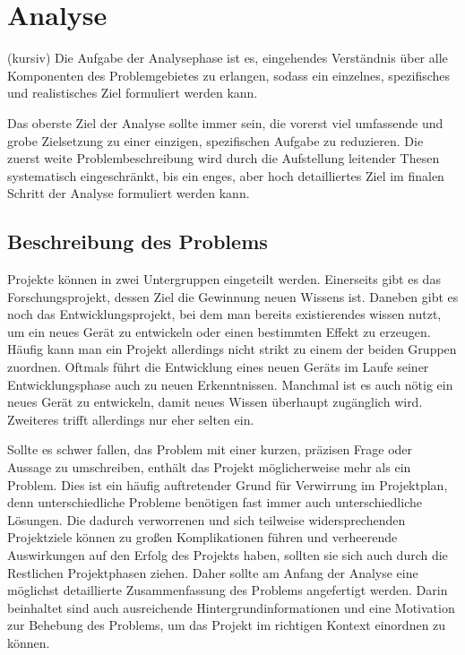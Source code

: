 \section{Analyse}
(kursiv)
Die Aufgabe der Analysephase ist es, eingehendes Verständnis über alle Komponenten des Problemgebietes 
zu erlangen, sodass ein einzelnes, spezifisches und realistisches Ziel formuliert werden kann.

Das oberste Ziel der Analyse sollte immer sein, die vorerst viel umfassende und grobe Zielsetzung zu 
einer einzigen, spezifischen Aufgabe zu reduzieren. Die zuerst weite Problembeschreibung wird durch 
die Aufstellung leitender Thesen systematisch eingeschränkt, bis ein enges, aber hoch detailliertes 
Ziel im finalen Schritt der Analyse formuliert werden kann.

    \subsection{Beschreibung des Problems}

    Projekte können in zwei Untergruppen eingeteilt werden. Einerseits gibt es das Forschungsprojekt, 
    dessen Ziel die Gewinnung neuen Wissens ist. Daneben gibt es noch das Entwicklungsprojekt, bei dem 
    man bereits existierendes wissen nutzt, um ein neues Gerät zu entwickeln oder einen bestimmten 
    Effekt zu erzeugen. Häufig kann man ein Projekt allerdings nicht strikt zu einem der beiden 
    Gruppen zuordnen. Oftmals führt die Entwicklung eines neuen Geräts im Laufe seiner Entwicklungsphase 
    auch zu neuen Erkenntnissen. Manchmal ist es auch nötig ein neues Gerät zu entwickeln, damit neues 
    Wissen überhaupt zugänglich wird. Zweiteres trifft allerdings nur eher selten ein.

    Sollte es schwer fallen, das Problem mit einer kurzen, präzisen Frage oder Aussage zu umschreiben, 
    enthält das Projekt möglicherweise mehr als ein Problem. Dies ist ein häufig auftretender Grund für 
    Verwirrung im Projektplan, denn unterschiedliche Probleme benötigen fast immer auch unterschiedliche 
    Lösungen. Die dadurch verworrenen und sich teilweise widersprechenden Projektziele können zu großen 
    Komplikationen führen und verheerende Auswirkungen auf den Erfolg des Projekts haben, sollten sie 
    sich auch durch die Restlichen Projektphasen ziehen.
    Daher sollte am Anfang der Analyse eine möglichst detaillierte Zusammenfassung des Problems 
    angefertigt werden. Darin beinhaltet sind auch ausreichende Hintergrundinformationen und eine 
    Motivation zur Behebung des Problems, um das Projekt im richtigen Kontext einordnen zu können.


